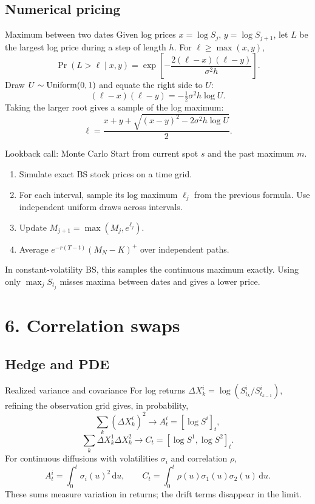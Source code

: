 \documentclass[handout,10pt,t,aspectratio=169]{beamer}
\newcommand{\dd}{\,\mathrm d}
\begin{document}
\subsection{Numerical pricing}


\begin{frame}{Maximum between two dates}
\small
Given log prices \(x=\log S_j\), \(y=\log S_{j+1}\), let \(L\) be the
largest log price during a step of length \(h\). For \(\ell\geq\max(x,y)\),
\[
 \Pr(L>\ell\mid x,y)=\exp\!\left[-\frac{2(\ell-x)(\ell-y)}{\sigma^2h}\right].
\]
Draw \(U\sim{\rm Uniform}(0,1)\) and equate the right side to \(U\):
\[
 (\ell-x)(\ell-y)=-\tfrac12\sigma^2h\log U.
\]
Taking the larger root gives a sample of the log maximum:
\[
 \boxed{\ell=\frac{x+y+\sqrt{(x-y)^2-2\sigma^2h\log U}}2.}
\]
\end{frame}

\begin{frame}{Lookback call: Monte Carlo}
\small
Start from current spot \(s\) and the past maximum \(m\).
\begin{enumerate}
\item Simulate exact BS stock prices on a time grid.
\item For each interval, sample its log maximum \(\ell_j\) from the previous formula.
Use independent uniform draws across intervals.
\item Update \(M_{j+1}=\max(M_j,e^{\ell_j})\).
\item Average \(e^{-r(T-t)}(M_N-K)^+\) over independent paths.
\end{enumerate}
In constant-volatility BS, this samples the continuous maximum exactly.
Using only \(\max_j S_{t_j}\) misses maxima between dates and gives a lower price.
\end{frame}


\section{6. Correlation swaps}
\subsection{Hedge and PDE}

\begin{frame}{Realized variance and covariance}
\small
For log returns \(\Delta X_k^i=\log(S^i_{t_k}/S^i_{t_{k-1}})\),
refining the observation grid gives, in probability,
\[
 \sum_k(\Delta X_k^i)^2\longrightarrow A_t^i=[\log S^i]_t,
\]
\[
 \sum_k\Delta X_k^1\Delta X_k^2\longrightarrow C_t=[\log S^1,\log S^2]_t.
\]
For continuous diffusions with volatilities \(\sigma_i\) and correlation \(\rho\),
\[
 A_t^i=\int_0^t\sigma_i(u)^2\dd u,\qquad
 C_t=\int_0^t\rho(u)\sigma_1(u)\sigma_2(u)\dd u.
\]
These sums measure variation in returns; the drift terms disappear in the limit.
\end{frame}
\end{document}
